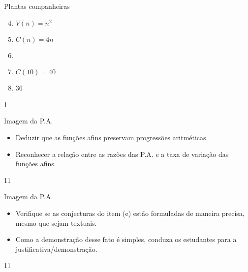 \begin{answer}{Plantas companheiras}
{
\begin{enumerate}\setcounter{enumi}{3}
\item $V(n)=n^2$

\item $C(n)=4n$
\clearpage
\item {}
{
}

\item $C(10)=40$

\item 36
\end{enumerate}
}{1}
\end{answer}
\begin{objectives}{Imagem da P.A.}
{
\begin{itemize}
\item Deduzir que as funções afins preservam progressões aritméticas.
\item Reconhecer a relação entre as razões das P.A. e a taxa de variação das funções afins.
\end{itemize}
}{1}{1}
\end{objectives}
\marginpar{\vspace{-2em}}
\begin{sugestions}{Imagem da P.A.}
{
\begin{itemize}
\item Verifique se as conjecturas do item (e) estão formuladas de maneira precisa, mesmo que sejam textuais.
\item Como a demonstração desse fato é simples, conduza os estudantes para a justificativa/demonstração.
\end{itemize}
}{1}{1}
\end{sugestions}
